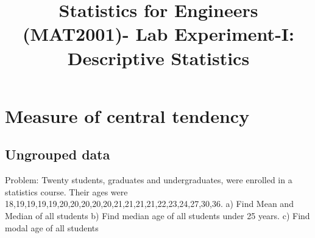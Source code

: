 \documentclass{article}\usepackage[]{graphicx}\usepackage[]{xcolor}
\date{}
\title{Statistics for Engineers (MAT2001)- Lab  Experiment-I:  Descriptive Statistics}
\begin{document}
\maketitle

\section{Measure of central tendency}
\subsection{Ungrouped data}
Problem: \newline
Twenty students, graduates and undergraduates, were enrolled in
a statistics course. Their ages were
18,19,19,19,19,20,20,20,20,20,21,21,21,21,22,23,24,27,30,36.
a) Find Mean and Median of all students
b) Find median age of all students under 25 years.
c) Find modal age of all students
\end{document}
